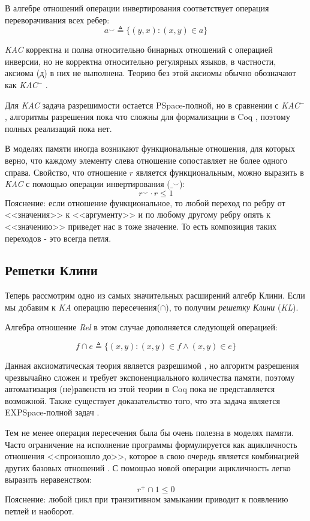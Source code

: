 \documentclass[times
              ,specification
              ,annotation
              ]{itmo-student-thesis}
\begin{document}
      В алгебре отношений операции инвертирования соответствует операция переворачивания всех ребер:
      $$ a^\smile \triangleq \{ (y, x): (x, y) \in a \} $$

      \textit{KAC} корректна и полна относительно бинарных отношений с операцией инверсии, но не
      корректна относительно регулярных языков, в частности, аксиома (д) в них не выполнена. Теорию без
      этой аксиомы обычно обозначают как \textit{KAC}$^-$ \cite{AlgebrasOfRelation}.

      Для \textit{KAC} задача разрешимости остается PSpace-полной, но в сравнении с \textit{KAC}$^-$,
      алгоритмы разрешения пока что сложны для формализации в Coq \cite{AlgebrasOfRelation}, поэтому
      полных реализаций пока нет.

      В моделях памяти иногда возникают функциональные отношения, для которых верно, что каждому
      элементу слева отношение сопоставляет не более одного справа.
      Свойство, что отношение $ r $ является функциональным, можно выразить в
      \textit{KAC} с помощью операции инвертирования ($ \_^{\smile} $):
      $$ r^{\smile} \cdot r \leq 1 $$
      Пояснение: если отношение функциональное, то любой переход по ребру от <<значения>> к
      <<аргументу>> и по любому другому ребру опять к <<значению>> приведет нас в тоже значение. То
      есть композиция таких переходов - это всегда петля.

    \subsection{Решетки Клини}
      Теперь рассмотрим одно из самых значительных расширений алгебр Клини.
      Если мы добавим к \textit{KA} операцию пересечения($\cap$),
      то получим \textit{решетку Клини} (\textit{KL}).

      Алгебра отношение \textit{Rel} в этом случае дополняется следующей операцией:

      $$ f \cap e \triangleq \{ (x, y) \colon (x, y) \in f \wedge (x, y) \in e \} $$

      Данная аксиоматическая теория является разрешимой \cite{petri_for_kal}, но алгоритм разрешения чрезвычайно
      сложен и требует экспоненциального количества памяти, поэтому автоматизация (не)равенств из этой
      теории в Coq пока не представляется возможной. Также существует доказательство того, что
      эта задача является EXPSpace-полной задач \cite{complexity_of_regular_intersection}.
      
      Тем не менее операция пересечения была бы очень полезна в моделях памяти.
      Часто ограничение на исполнение программы формулируется как ацикличность отношения <<произошло
      до>>, которое в свою очередь является комбинацией других базовых отношений \cite{rc11}. С помощью
      новой операции ацикличность легко выразить неравенством:
      $$ r^+ \cap 1 \leq 0 $$
      Пояснение: любой цикл при транзитивном замыкании приводит к появлению петлей и наоборот.
\end{document}
